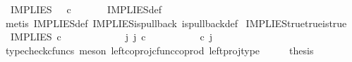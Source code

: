 \begin{isabellebody}
\ \ {\isachardoublequoteopen}IMPLIES\ {\isacharcolon}{\kern0pt}\ {\isasymOmega}\ {\isasymtimes}\isactrlsub c\ {\isasymOmega}\ {\isasymrightarrow}\ {\isasymOmega}{\isachardoublequoteclose}\isanewline
%
\isadelimproof
\ \ %
\endisadelimproof
%
\isatagproof
{}\isamarkupfalse%
\ IMPLIES{\isacharunderscore}{\kern0pt}def\isanewline
\ \ \isamarkupfalse%
\ {\isacharparenleft}{\kern0pt}metis\ IMPLIES{\isacharunderscore}{\kern0pt}def\ IMPLIES{\isacharunderscore}{\kern0pt}is{\isacharunderscore}{\kern0pt}pullback\ is{\isacharunderscore}{\kern0pt}pullback{\isacharunderscore}{\kern0pt}def{\isacharparenright}{\kern0pt}%
\endisatagproof
{\isafoldproof}%
%
\isadelimproof
\isanewline
%
\endisadelimproof
\isanewline
{}\isamarkupfalse%
\ IMPLIES{\isacharunderscore}{\kern0pt}true{\isacharunderscore}{\kern0pt}true{\isacharunderscore}{\kern0pt}is{\isacharunderscore}{\kern0pt}true{\isacharcolon}{\kern0pt}\isanewline
\ \ {\isachardoublequoteopen}IMPLIES\ {\isasymcirc}\isactrlsub c\ {\isasymlangle}{\isasymt}{\isacharcomma}{\kern0pt}{\isasymt}{\isasymrangle}\ {\isacharequal}{\kern0pt}\ {\isasymt}{\isachardoublequoteclose}\isanewline
%
\isadelimproof
%
\endisadelimproof
%
\isatagproof
{}\isamarkupfalse%
\ {\isacharminus}{\kern0pt}\ \ \ \isanewline
\ \ \isamarkupfalse%
\ {\isachardoublequoteopen}{\isasymexists}\ j{\isachardot}{\kern0pt}\ j\ {\isasymin}\isactrlsub c\ {\isasymone}\ {\isasymCoprod}\ {\isacharparenleft}{\kern0pt}{\isasymone}{\isasymCoprod}{\isasymone}{\isacharparenright}{\kern0pt}\ {\isasymand}\ {\isacharparenleft}{\kern0pt}{\isasymlangle}{\isasymt}{\isacharcomma}{\kern0pt}\ {\isasymt}{\isasymrangle}{\isasymamalg}\ {\isacharparenleft}{\kern0pt}{\isasymlangle}{\isasymf}{\isacharcomma}{\kern0pt}\ {\isasymf}{\isasymrangle}\ {\isasymamalg}{\isasymlangle}{\isasymf}{\isacharcomma}{\kern0pt}\ {\isasymt}{\isasymrangle}{\isacharparenright}{\kern0pt}{\isacharparenright}{\kern0pt}\ {\isasymcirc}\isactrlsub c\ j\ \ {\isacharequal}{\kern0pt}\ {\isasymlangle}{\isasymt}{\isacharcomma}{\kern0pt}{\isasymt}{\isasymrangle}{\isachardoublequoteclose}\isanewline
\ \ \ \ \isamarkupfalse%
\ {\isacharparenleft}{\kern0pt}typecheck{\isacharunderscore}{\kern0pt}cfuncs{\isacharcomma}{\kern0pt}\ meson\ left{\isacharunderscore}{\kern0pt}coproj{\isacharunderscore}{\kern0pt}cfunc{\isacharunderscore}{\kern0pt}coprod\ left{\isacharunderscore}{\kern0pt}proj{\isacharunderscore}{\kern0pt}type{\isacharparenright}{\kern0pt}\isanewline
\ \ \isamarkupfalse%
\ \isamarkupfalse%
\ {\isacharquery}{\kern0pt}thesis\isanewline

\end{isabellebody}
